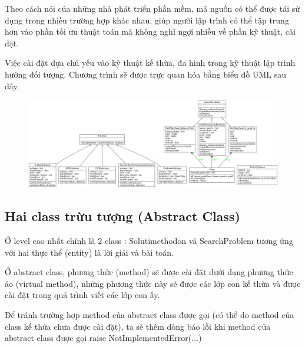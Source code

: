 \documentclass[11pt]{scrartcl} %
\begin{document}
Theo cách nói của những nhà phát triển phần mềm, mã nguồn có thể được tái sử dụng trong nhiều trường hợp khác nhau, giúp người lập trình có thể tập trung hơn vào phần tối ưu thuật toán mà không nghĩ ngợi nhiều về phần kỹ thuật, cài đặt.

Việc cài đặt dựa chủ yếu vào kỹ thuật kế thừa, đa hình trong kỹ thuật lập trình hướng đối tượng. Chương trình sẽ được trực quan hóa bằng biểu đồ UML sau đây.

\newpage
\begin{figure}[h] %
	\centering
	\includegraphics[width=1.2\columnwidth]{Figures/UML.png} %
\end{figure}

\subsection{Hai class trừu tượng (Abstract Class)}
Ở level cao nhất chính là 2 class : Solutimethodon và SearchProblem tương ứng với hai thực thể (entity) là lời giải và bài toán.

Ở abstract class, phương thức (method) sẽ được cài đặt dưới dạng phương thức ảo (virtual method), những phương thức này sẽ được các lớp con kế thừa và được cài đặt trong quá trình viết các lớp con ấy.

Để tránh trường hợp method của abstract class được gọi (có thể do method của class kế thừa chưa được cài đặt), ta sẽ thêm dòng báo lỗi khi method của abstract class được gọi raise NotImplementedError(...)


\end{document}
